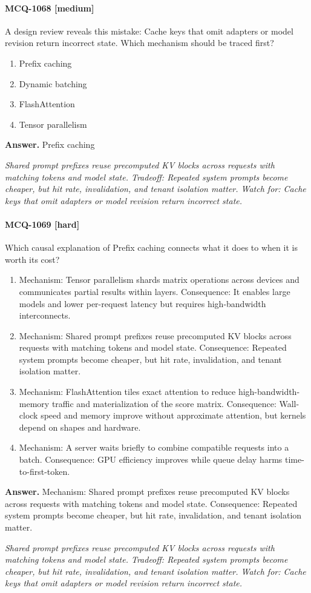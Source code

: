\paragraph{MCQ-1068 [medium]} A design review reveals this mistake: Cache keys that omit adapters or model revision return incorrect state. Which mechanism should be traced first?
\begin{enumerate}[label=\Alph*.]
\item Prefix caching
\item Dynamic batching
\item FlashAttention
\item Tensor parallelism
\end{enumerate}
\noindent\textbf{Answer.} Prefix caching
\par\textit{Shared prompt prefixes reuse precomputed KV blocks across requests with matching tokens and model state. Tradeoff: Repeated system prompts become cheaper, but hit rate, invalidation, and tenant isolation matter. Watch for: Cache keys that omit adapters or model revision return incorrect state.}
\paragraph{MCQ-1069 [hard]} Which causal explanation of Prefix caching connects what it does to when it is worth its cost?
\begin{enumerate}[label=\Alph*.]
\item Mechanism: Tensor parallelism shards matrix operations across devices and communicates partial results within layers. Consequence: It enables large models and lower per-request latency but requires high-bandwidth interconnects.
\item Mechanism: Shared prompt prefixes reuse precomputed KV blocks across requests with matching tokens and model state. Consequence: Repeated system prompts become cheaper, but hit rate, invalidation, and tenant isolation matter.
\item Mechanism: FlashAttention tiles exact attention to reduce high-bandwidth-memory traffic and materialization of the score matrix. Consequence: Wall-clock speed and memory improve without approximate attention, but kernels depend on shapes and hardware.
\item Mechanism: A server waits briefly to combine compatible requests into a batch. Consequence: GPU efficiency improves while queue delay harms time-to-first-token.
\end{enumerate}
\noindent\textbf{Answer.} Mechanism: Shared prompt prefixes reuse precomputed KV blocks across requests with matching tokens and model state. Consequence: Repeated system prompts become cheaper, but hit rate, invalidation, and tenant isolation matter.
\par\textit{Shared prompt prefixes reuse precomputed KV blocks across requests with matching tokens and model state. Tradeoff: Repeated system prompts become cheaper, but hit rate, invalidation, and tenant isolation matter. Watch for: Cache keys that omit adapters or model revision return incorrect state.}
